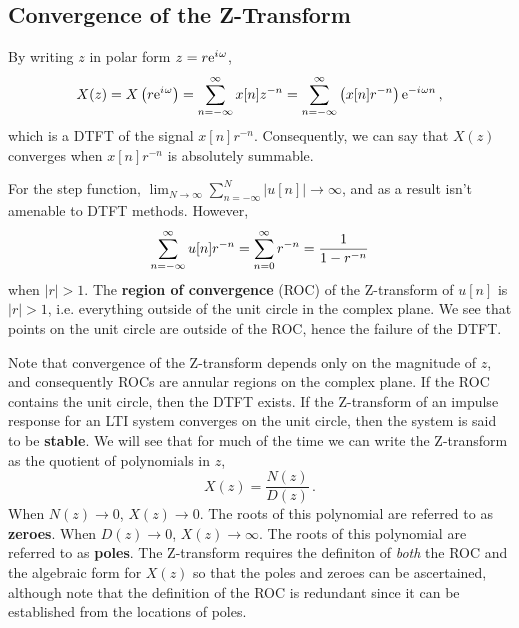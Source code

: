 \subsection{Convergence of the Z-Transform}
%
By writing $z$ in polar form $z = r\mathrm{e}^{{i\mkern1mu}\omega}$,
%
\begin{displaymath}
  X(z) = X\left(r\mathrm{e}^{{i\mkern1mu}\omega}\right) = \sum_{n=-\infty}^\infty x[n]z^{-n}
  = \sum_{n=-\infty}^\infty\left(x[n]r^{-n}\right)\mathrm{e}^{-{i\mkern1mu}\omega n} \,,
\end{displaymath}
%
which is a DTFT of the signal $x[n]r^{-n}$. Consequently, we can say
that $X(z)$ converges when $x[n]r^{-n}$ is absolutely summable.
%
\begin{exmp}
  For the step function,
  $\lim_{N\rightarrow\infty}\sum_{n=-\infty}^N|u[n]|\rightarrow\infty$,
  and as a result isn't amenable to DTFT methods. However,
  \begin{displaymath}
    \sum_{n=-\infty}^\infty u[n]r^{-n} = \sum_{n=0}^\infty r^{-n} = \frac{1}{1-r^{-n}}
  \end{displaymath}
  when $|r| > 1$. The \textbf{region of convergence} (ROC) of the
  Z-transform of $u[n]$ is $|r| > 1$, i.e. everything outside of the
  unit circle in the complex plane. We see that points on the unit
  circle are outside of the ROC, hence the failure of the DTFT.
\end{exmp}
%
Note that convergence of the Z-transform depends only on the magnitude of
$z$, and consequently ROCs are annular regions on the complex plane. If
the ROC contains the unit circle, then the DTFT exists. If the Z-transform
of an impulse response for an LTI system converges on the unit circle,
then the system is said to be \textbf{stable}. We will see that for
much of the time we can write the Z-transform as the quotient of
polynomials in $z$,
%
\begin{displaymath}
  X(z) = \frac{N(z)}{D(z)} \,.
\end{displaymath}
%
When $N(z)\rightarrow 0$, $X(z)\rightarrow 0$. The roots of this
polynomial are referred to as \textbf{zeroes}. When $D(z)\rightarrow 0$,
$X(z)\rightarrow\infty$. The roots of this polynomial are referred
to as \textbf{poles}. The Z-transform requires the definiton of \textit{both} the
ROC and the algebraic form for $X(z)$ so that the poles and zeroes can
be ascertained, although note that the definition of the ROC is redundant since
it can be established from the locations of poles.
%
